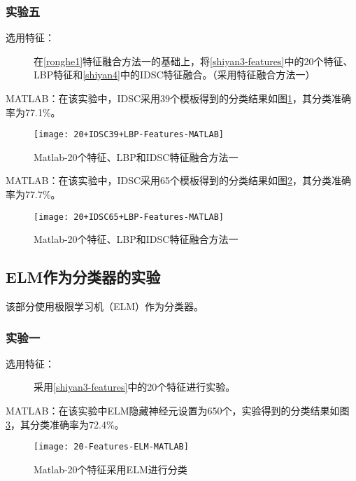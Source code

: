 \subsubsection{实验五}
\begin{description}
\item[选用特征：] 在\ref{ronghe1}特征融合方法一的基础上，将\ref{shiyan3-features}中的20个特征、LBP特征和\ref{shiyan4}中的IDSC特征融合。（采用特征融合方法一）
\end{description}
MATLAB：在该实验中，IDSC采用39个模板得到的分类结果如图\ref{fig:20+IDSC39+LBP-Features-MATLAB}，其分类准确率为77.1\%。
\begin{figure}[!ht]
\centering
\texttt{[image: 20+IDSC39+LBP-Features-MATLAB]}
\caption{Matlab-20个特征、LBP和IDSC特征融合方法一}
\label{fig:20+IDSC39+LBP-Features-MATLAB}
\end{figure}

MATLAB：在该实验中，IDSC采用65个模板得到的分类结果如图\ref{fig:20+IDSC65+LBP-Features-MATLAB}，其分类准确率为77.7\%。
\begin{figure}[!ht]
\centering
\texttt{[image: 20+IDSC65+LBP-Features-MATLAB]}
\caption{Matlab-20个特征、LBP和IDSC特征融合方法一}
\label{fig:20+IDSC65+LBP-Features-MATLAB}
\end{figure}

\subsection{ELM作为分类器的实验}
该部分使用极限学习机（ELM）作为分类器。

\subsubsection{实验一}
\begin{description}
\item[选用特征：] 采用\ref{shiyan3-features}中的20个特征进行实验。
\end{description}
MATLAB：在该实验中ELM隐藏神经元设置为650个，实验得到的分类结果如图\ref{fig:20-Features-ELM-MATLAB}，其分类准确率为72.4\%。
\begin{figure}[!ht]
\centering
\texttt{[image: 20-Features-ELM-MATLAB]}
\caption{Matlab-20个特征采用ELM进行分类}
\label{fig:20-Features-ELM-MATLAB}
\end{figure}


